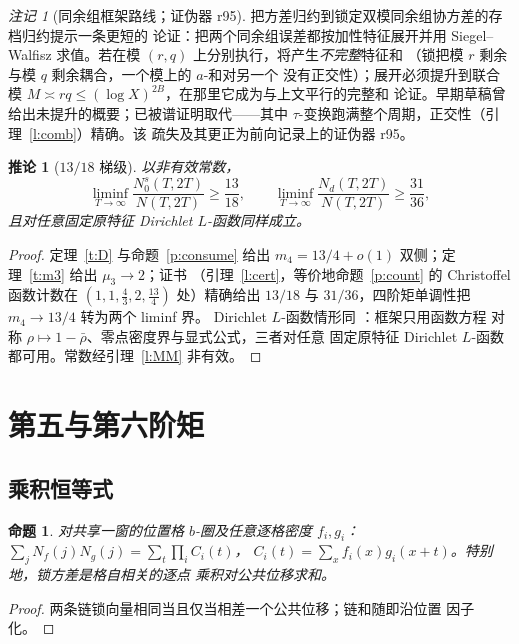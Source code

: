 \documentclass[11pt]{article}
\numberwithin{equation}{section}
\newtheorem{proposition}[theorem]{命题}
\newtheorem{corollary}[theorem]{推论}
\theoremstyle{definition}
\theoremstyle{remark}
\newtheorem{remark}[theorem]{注记}
\begin{document}
\begin{remark}[同余组框架路线；证伪器 r95]\label{rem:prog}
把方差归约到锁定双模同余组协方差的存档归约提示一条更短的
论证：把两个同余组误差都按加性特征展开并用 Siegel--Walfisz
求值。若在模 $(r,q)$ 上分别执行，将产生\emph{不完整}特征和
（锁把模 $r$ 剩余与模 $q$ 剩余耦合，一个模上的 $a$-和对另一个
没有正交性）；展开必须提升到联合模
$M\asymp rq\le(\log X)^{2B}$，在那里它成为与上文平行的完整和
论证。早期草稿曾给出未提升的概要；已被谱证明取代——其中
$\tau$-变换跑满整个周期，正交性（引理~\ref{l:comb}）精确。该
疏失及其更正为前向记录上的证伪器 r95。
\end{remark}

\begin{corollary}[$13/18$ 梯级]\label{c:1318}
以非有效常数，
\[
\liminf_{T\to\infty}\frac{N_0^{s}(T,2T)}{N(T,2T)}\ge\frac{13}{18},
\qquad
\liminf_{T\to\infty}\frac{N_d(T,2T)}{N(T,2T)}\ge\frac{31}{36},
\]
且对任意固定原特征 Dirichlet $L$-函数同样成立。
\end{corollary}

\begin{proof}
定理~\ref{t:D} 与命题~\ref{p:consume} 给出 $m_4=13/4+o(1)$
双侧；定理~\ref{t:m3} 给出 $\mu_3\to2$；证书
（引理~\ref{l:cert}，等价地命题~\ref{p:count} 的 Christoffel
函数计数在 $(1,1,\tfrac43,2,\tfrac{13}4)$ 处）精确给出 $13/18$
与 $31/36$，四阶矩单调性把 $m_4\to13/4$ 转为两个 liminf 界。
Dirichlet $L$-函数情形同 \cite[定理~E]{C26}：框架只用函数方程
对称 $\rho\mapsto1-\bar\rho$、零点密度界与显式公式，三者对任意
固定原特征 Dirichlet $L$-函数都可用。常数经引理~\ref{l:MM}
非有效。
\end{proof}

\section{第五与第六阶矩}\label{s:five}

\subsection{乘积恒等式}

\begin{proposition}\label{p:prod}
对共享一窗的位置格 $b$-圈及任意逐格密度 $f_i,g_i$：
$\sum_jN_f(j)N_g(j)=\sum_t\prod_iC_i(t)$，
$C_i(t)=\sum_xf_i(x)g_i(x+t)$。特别地，锁方差是格自相关的逐点
乘积对公共位移求和。
\end{proposition}

\begin{proof}
两条链锁向量相同当且仅当相差一个公共位移；链和随即沿位置
因子化。
\end{proof}
\end{document}
